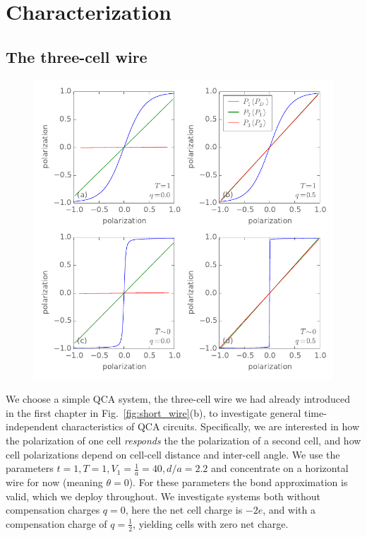 \chapter{Characterization}
\graphicspath{{../gfx/chapter03/}{../plots/chapter03/}}


\section{The three-cell wire}

%
\begin{figure}
  \center
  \includegraphics{three_cells_PP}
  \caption{
  }
  \label{fig:three_cells_PP}
\end{figure}
%
We choose a simple QCA system, the three-cell wire we had already introduced in
the first chapter in Fig.~\ref{fig:short_wire}(b), to investigate general
time-independent characteristics of QCA circuits. Specifically, we are
interested in how the polarization of one cell \emph{responds} the the
polarization of a second cell, and how cell polarizations depend on cell-cell
distance and inter-cell angle. We use the parameters $t = 1, T = 1, V_1 =
\frac{1}{a} = 40, d/a = 2.2$ and concentrate on a horizontal wire for now
(meaning $\theta = 0$). For these parameters the bond approximation is valid,
which we deploy throughout. We investigate systems both without compensation
charges $q = 0$, here the net cell charge is $- 2 e$, and with a compensation
charge of $q=\frac{1}{2}$, yielding cells with zero net charge.

